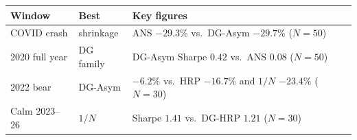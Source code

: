 \begin{tabular}{@{}p{1.8cm}p{1.7cm}>{\raggedright\arraybackslash}p{3.6cm}@{}}
\toprule
Window & Best & Key figures\\
\midrule
COVID crash & shrinkage & ANS $-29.3\%$ vs.\ DG-Asym $-29.7\%$ ($N{=}50$)\\
2020 full year & DG family & DG-Asym Sharpe $0.42$ vs.\ ANS $0.08$ ($N{=}50$)\\
2022 bear & DG-Asym & $-6.2\%$ vs.\ HRP $-16.7\%$ and $1/N$ $-23.4\%$ ($N{=}30$)\\
Calm 2023--26 & $1/N$ & Sharpe $1.41$ vs.\ DG-HRP $1.21$ ($N{=}30$)\\
\bottomrule
\end{tabular}
